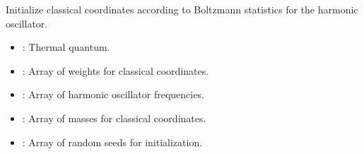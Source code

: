 \documentclass[letterpaper,10pt,english]{sphinxmanual}
\begin{document}
\begin{fulllineitems}
\label{\detokenize{software_reference/ingredients/ingredients:qc_lab.ingredients.harmonic_oscillator_boltzmann_init_classical}}
\pysigstartsignatures
\pysiglinewithargsret
{}
{\sphinxparamcomma {}\sphinxparamcomma {}\sphinxparamcomma {}}
{}
\pysigstopsignatures
\sphinxAtStartPar
Initialize classical coordinates according to Boltzmann statistics for the harmonic oscillator.
\begin{description}
\begin{itemize}
\item {} 
\sphinxAtStartPar
{}: Thermal quantum.

\item {} 
\sphinxAtStartPar
{}: Array of weights for classical coordinates.

\item {} 
\sphinxAtStartPar
{}: Array of harmonic oscillator frequencies.

\item {} 
\sphinxAtStartPar
{}: Array of masses for classical coordinates.

\end{itemize}

\begin{itemize}
\item {} 
\sphinxAtStartPar
{}: Array of random seeds for initialization.

\end{itemize}

\end{description}

\end{fulllineitems}

\end{document}
